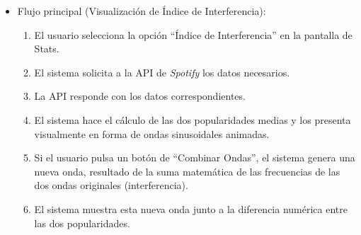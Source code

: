 \begin{itemize}
    \item Flujo principal (Visualización de Índice de Interferencia):
          \begin{enumerate}
              \item El usuario selecciona la opción ``Índice de Interferencia'' en la pantalla de Stats.
              \item El sistema solicita a la API de \textit{Spotify} los datos necesarios.
              \item La API responde con los datos correspondientes.
              \item El sistema hace el cálculo de las dos popularidades medias y los presenta visualmente en forma de ondas sinusoidales animadas.
              \item Si el usuario pulsa un botón de ``Combinar Ondas'', el sistema genera una nueva onda, resultado de la suma matemática de las frecuencias de las dos ondas originales (interferencia).
              \item El sistema muestra esta nueva onda junto a la diferencia numérica entre las dos popularidades.
          \end{enumerate}
\end{itemize}
